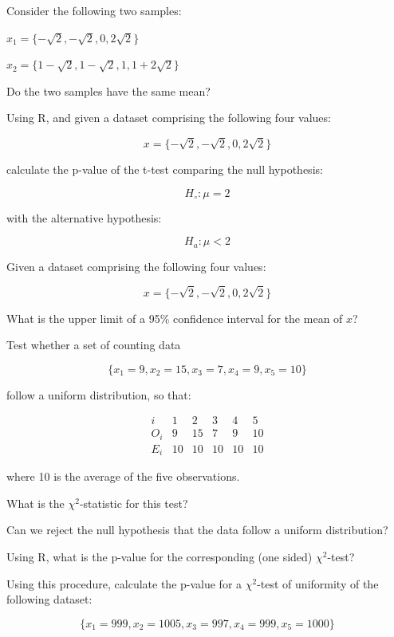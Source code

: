 \documentclass{article}
\begin{document}
\vspace{1cm}

\begin{minipage}{16cm}
Consider the following two samples:\medskip

$x_1 = \{-\sqrt{2},-\sqrt{2},0,2\sqrt{2}\}$\medskip

$x_2 = \{1-\sqrt{2},1-\sqrt{2},1,1+2\sqrt{2}\}$\medskip

Do the two samples have the same mean?
\end{minipage}

\vspace{1cm}

\begin{minipage}{15cm}
Using R, and given a dataset comprising the following four values:

\[x=\{-\sqrt{2},-\sqrt{2},0,2\sqrt{2}\}\]

calculate the p-value of the t-test comparing the null hypothesis:

\[H_\circ: \mu = 2\]

with the alternative hypothesis:

\[ H_a: \mu < 2 \]
\end{minipage}

\vspace{1cm}

\begin{minipage}{15cm}
Given a dataset comprising the following four values:

\[
x=\{-\sqrt{2},-\sqrt{2},0,2\sqrt{2}\}
\]

What is the upper limit of a 95\% confidence interval for the mean of $x$?

\end{minipage}

\vspace{1cm}

\begin{minipage}{15cm}
Test whether a set of counting data

\[
\{x_1=9, x_2=15, x_3=7, x_4=9, x_5=10\}
\]

follow a uniform distribution, so that:

\[
\begin{array}{c|ccccc}
  i & 1 & 2 & 3 & 4 & 5 \\ \hline
  O_i & 9 & 15 & 7 & 9 & 10 \\
  E_i & 10 & 10 & 10 & 10 & 10
\end{array} \]

where 10 is the average of the five observations.\medskip

What is the \(\chi^2\)-statistic for this test?\medskip

Can we reject the null hypothesis that the data follow a uniform
distribution?\medskip

Using R, what is the p-value for the corresponding (one sided)
\(\chi^2\)-test?\medskip

Using this procedure, calculate the p-value for a \(\chi^2\)-test of
uniformity of the following dataset:

\[
\{x_1=999, x_2=1005, x_3=997, x_4=999, x_5=1000\}
\]

\end{minipage}
\end{document}
